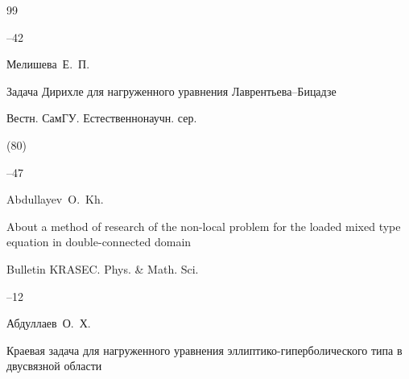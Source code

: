 \begin{thebibliography}{99}


--42















\by Мелишева~Е.~П.

\paper Задача Дирихле для нагруженного уравнения Лаврентьева--Бицадзе

\jour Вестн. СамГУ. Естественнонаучн. сер.


(80)

--47














\by Abdullayev~O.~Kh.

\paper About a method of research of the non-local problem for the loaded mixed type equation in double-connected domain

\jour Bulletin KRASEC. Phys. \& Math. Sci.




--12






\by Абдуллаев~О.~Х.

\paper Краевая задача для нагруженного уравнения эллиптико-гиперболического типа в двусвязной области


\end{thebibliography}
